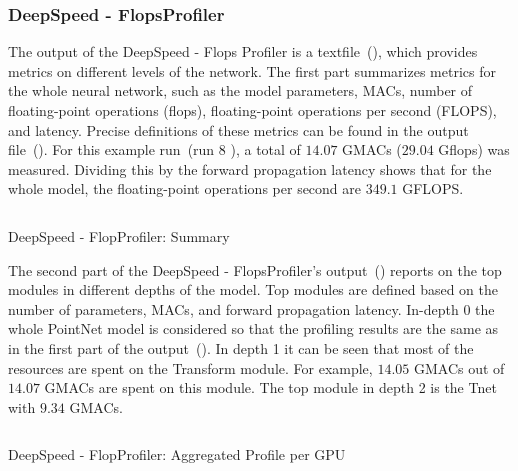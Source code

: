 \documentclass[12pt, a4paper, hidelinks]{article}
\begin{document}
\subsubsection{DeepSpeed - FlopsProfiler}
\label{sec:r-flopsprofiler}

The output of the DeepSpeed - Flops Profiler is a textfile~(), which provides metrics on different levels of the network. The first part summarizes metrics for the whole neural network, such as the model parameters, \ac{MACs}, number of floating-point operations (flops), floating-point operations per second (FLOPS), and latency. Precise definitions of these metrics can be found in the output file~(). For this example run~(run 8 ), a total of $14.07$ GMACs ($29.04$ Gflops) was measured. Dividing this by the forward propagation latency shows that for the whole model, the floating-point operations per second are $349.1$ GFLOPS.

\begin{listing}[H]
\inputminted[xleftmargin=1em,linenos,fontsize=\small, firstline=2,lastline=16, breaklines]{python}{./assets/scap_gtx1080_deepspeed_14615344_4294967294_one-epoch.txt}
\caption{DeepSpeed - FlopProfiler: Summary}
\label{lst:scap_gtx1080_deepspeed_14615344_4294967294_one-epoch-summary}
\end{listing}

The second part of the DeepSpeed - FlopsProfiler's output~() reports on the top modules in different depths of the model. Top modules are defined based on the number of parameters, \ac{MACs}, and forward propagation latency. In-depth 0 the whole PointNet model is considered so that the profiling results are the same as in the first part of the output~().
In depth 1 it can be seen that most of the resources are spent on the Transform module. For example, $14.05$ GMACs out of $14.07$ GMACs are spent on this module.
The top module in depth 2 is the Tnet with $9.34$ GMACs.

\begin{listing}[H]
\inputminted[xleftmargin=1em,linenos,fontsize=\small, firstline=19,lastline=31, breaklines]{python}{./assets/scap_gtx1080_deepspeed_14615344_4294967294_one-epoch.txt}
\caption{DeepSpeed - FlopProfiler: Aggregated Profile per GPU}
\label{lst:scap_gtx1080_deepspeed_14615344_4294967294_one-epoch-aggregated}
\end{listing}
\end{document}
